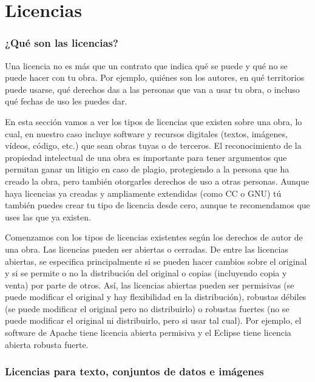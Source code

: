 \appendix
\chapter{Licencias} \label{anexo:licencias}
\subsection{¿Qué son las licencias?}

Una licencia no es más que un contrato que indica qué se puede y qué no se puede hacer con tu obra. Por ejemplo, quiénes son los autores, en qué territorios puede usarse, qué derechos das a las personas que van a usar tu obra, o incluso qué fechas de uso les puedes dar. 

En esta sección vamos a ver los tipos de licencias que existen sobre una obra, lo cual, en nuestro caso incluye software y recursos digitales (textos, imágenes, vídeos, código, etc.) que sean obras tuyas o de terceros. El reconocimiento de la propiedad intelectual de una obra es importante para tener argumentos que permitan ganar un litigio en caso de plagio, protegiendo a la persona que ha creado la obra, pero también otorgarles derechos de uso a otras personas. Aunque haya licencias ya creadas y ampliamente extendidas (como CC o GNU) tú también puedes crear tu tipo de licencia desde cero, aunque te recomendamos que uses las que ya existen.

Comenzamos con los tipos de licencias existentes según los derechos de autor de una obra. Las licencias pueden ser abiertas o cerradas. De entre las licencias abiertas, se especifica principalmente si se pueden hacer cambios sobre el original y si se permite o no la distribución del original o copias (incluyendo copia y venta) por parte de otros. Así, las licencias abiertas pueden ser permisivas (se puede modificar el original y hay flexibilidad en la distribución), robustas débiles (se puede modificar el original pero no distribuirlo) o robustas fuertes (no se puede modificar el original ni distribuirlo, pero si usar tal cual). Por ejemplo, el software de Apache tiene licencia abierta permisiva y el Eclipse tiene licencia abierta robusta fuerte.

\subsection{Licencias para texto, conjuntos de datos e imágenes}

